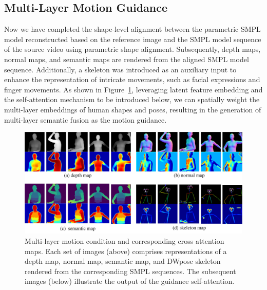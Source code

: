 \subsection{Multi-Layer Motion Guidance}
\label{subsec:guidance}

Now we have completed the shape-level alignment between the parametric SMPL model reconstructed based on the reference image and the SMPL model sequence of the source video using parametric shape alignment.
Subsequently, depth maps, normal maps, and semantic maps are rendered from the aligned SMPL model sequence.
Additionally, a skeleton was introduced as an auxiliary input to enhance the representation of intricate movements, such as facial expressions and finger movements. 
As shown in Figure~\ref{fig:motion_guidance}, leveraging latent feature embedding and the self-attention mechanism to be introduced below, we can spatially weight the multi-layer embeddings of human shapes and poses, resulting in the generation of multi-layer semantic fusion as the motion guidance.

\begin{figure}[t]
  \centering
  \includegraphics[width=1.0\linewidth]{fig/motion_guidance.jpg}
  \caption{Multi-layer motion condition and corresponding cross attention maps. 
Each set of images (above) comprises representations of a depth map, normal map, semantic map, and DWpose skeleton rendered from the corresponding SMPL sequences.
The subsequent images (below) illustrate the output of the guidance self-attention.}
  \vspace{-5mm}
  \label{fig:motion_guidance}
\end{figure}



